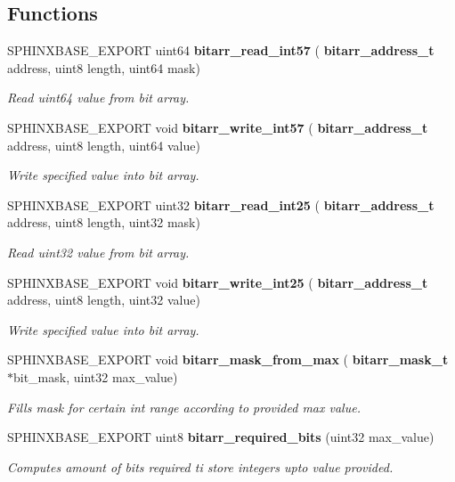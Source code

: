 \subsection*{Functions}
\begin{DoxyCompactItemize}
\item 
S\+P\+H\+I\+N\+X\+B\+A\+S\+E\+\_\+\+E\+X\+P\+O\+RT uint64 \textbf{ bitarr\+\_\+read\+\_\+int57} (\textbf{ bitarr\+\_\+address\+\_\+t} address, uint8 length, uint64 mask)
\begin{DoxyCompactList}\small\item\em Read uint64 value from bit array. \end{DoxyCompactList}\item 
S\+P\+H\+I\+N\+X\+B\+A\+S\+E\+\_\+\+E\+X\+P\+O\+RT void \textbf{ bitarr\+\_\+write\+\_\+int57} (\textbf{ bitarr\+\_\+address\+\_\+t} address, uint8 length, uint64 value)
\begin{DoxyCompactList}\small\item\em Write specified value into bit array. \end{DoxyCompactList}\item 
S\+P\+H\+I\+N\+X\+B\+A\+S\+E\+\_\+\+E\+X\+P\+O\+RT uint32 \textbf{ bitarr\+\_\+read\+\_\+int25} (\textbf{ bitarr\+\_\+address\+\_\+t} address, uint8 length, uint32 mask)
\begin{DoxyCompactList}\small\item\em Read uint32 value from bit array. \end{DoxyCompactList}\item 
S\+P\+H\+I\+N\+X\+B\+A\+S\+E\+\_\+\+E\+X\+P\+O\+RT void \textbf{ bitarr\+\_\+write\+\_\+int25} (\textbf{ bitarr\+\_\+address\+\_\+t} address, uint8 length, uint32 value)
\begin{DoxyCompactList}\small\item\em Write specified value into bit array. \end{DoxyCompactList}\item 
S\+P\+H\+I\+N\+X\+B\+A\+S\+E\+\_\+\+E\+X\+P\+O\+RT void \textbf{ bitarr\+\_\+mask\+\_\+from\+\_\+max} (\textbf{ bitarr\+\_\+mask\+\_\+t} $\ast$bit\+\_\+mask, uint32 max\+\_\+value)
\begin{DoxyCompactList}\small\item\em Fills mask for certain int range according to provided max value. \end{DoxyCompactList}\item 
S\+P\+H\+I\+N\+X\+B\+A\+S\+E\+\_\+\+E\+X\+P\+O\+RT uint8 \textbf{ bitarr\+\_\+required\+\_\+bits} (uint32 max\+\_\+value)
\begin{DoxyCompactList}\small\item\em Computes amount of bits required ti store integers upto value provided. \end{DoxyCompactList}\end{DoxyCompactItemize}


